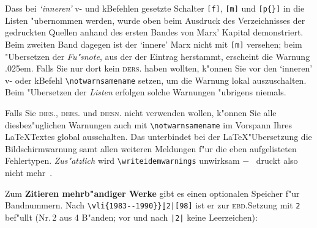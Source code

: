 \documentclass[12pt,a4paper]{article}
\begin{document}
\vspace{1.25ex}\noindent
Dass bei \hspace{-.075em}\textit{`inneren'} v- und k\fhy Befehlen gesetzte Schalter \verb|[f]|, 
\verb|[m]| und \verb|[p{}]| in die Listen "ubernommen werden, wurde oben 
beim Ausdruck des Verzeichnisses der gedruckten Quellen anhand des ersten 
Bandes von Marx' Kapital demonstriert. Beim zweiten Band dagegen ist 
der `innere' Marx nicht mit \verb|[m]| versehen; beim "Ubersetzen der 
\textit{Fu"snote}, aus der der Eintrag herstammt, erscheint die Warnung 
\kern.025em. 
\hspace{.1em}Falls Sie nur dort kein \textsc{ders.} haben wollten, k"onnen
Sie vor den `inneren' v- oder k\fhy Befehl \verb|\notwarnsamename| 
setzen, um die Warnung lokal auszuschalten. Beim 
"Ubersetzen der \textit{Listen} erfolgen solche Warnungen "ubrigens niemals.

\vfill\noindent
Falls Sie \textsc{dies.}, \textsc{ders.} und \textsc{diesn.} nicht
verwenden wollen, k"onnen Sie alle diesbez"uglichen Warnungen auch 
mit \verb|\notwarnsamename| im Vorspann Ihres \LaTeX\hy Textes
global ausschalten. Das unterbindet bei der \LaTeX\hy "Ubersetzung die 
Bildschirmwarnung  \hspace{.25em}samt allen weiteren Meldungen f"ur die eben 
aufgelisteten Fehlertypen. \textit{Zus"atzlich} wird 
\verb|\writeidemwarnings| unwirksam $-$ \BibArts\ druckt also nicht 
mehr \hspace{.1em}{\small$\bullet\,\heartsuit\,\nabla\,\spadesuit\,\clubsuit$}\,.


\newpage\noindent
Zum \textbf{Zitieren mehrb"andiger Werke} gibt es einen optionalen Speicher 
f"ur Bandnummern. Nach 
\hspace{.2em}\verb+\vli+\verb+{1983--1990}+\texttt{\b{\b{\}}}}\verb+|2|[98]+\vspace{-.2ex}
\hspace{.2em}ist er 
zur \textsc{ebd.}\hy Setzung mit \verb|2| \hspace{.05em}bef"ullt (Nr.\,2 aus 4 B"anden;
vor und nach \verb+|2|+ keine Leerzeichen):
\end{document}
